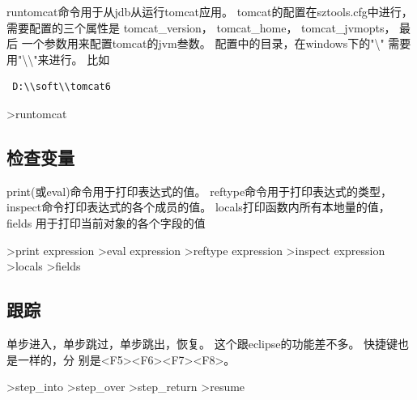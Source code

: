 \documentclass[oneside,openany]{book}
\begin{document}
    runtomcat命令用于从jdb从运行tomcat应用。 tomcat的配置在sztools.cfg中进行， 
    需要配置的三个属性是 tomcat\_version， tomcat\_home， tomcat\_jvmopts， 最后
    一个参数用来配置tomcat的jvm叁数。 配置中的目录，在windows下的"\textbackslash"
    需要用"\textbackslash\textbackslash"来进行。 比如
    \begin{verbatim} D:\\soft\\tomcat6 \end{verbatim}
    \begin{mdframed}[style=SmallFrame]
     \begin{flushleft}
      >runtomcat
     \end{flushleft}
    \end{mdframed}

  \subsection{检查变量}
    print(或eval)命令用于打印表达式的值。 reftype命令用于打印表达式的类型，
  inspect命令打印表达式的各个成员的值。 locals打印函数内所有本地量的值， fields
  用于打印当前对象的各个字段的值
    \begin{mdframed}[style=SmallFrame]
      \begin{flushleft}
      >print expression\newline
      >eval expression\newline
      >reftype expression\newline                      
      >inspect expression\newline                      
      >locals\newline                      
      >fields
      \end{flushleft}
    \end{mdframed}

  \subsection{跟踪}

    单步进入，单步跳过，单步跳出，恢复。 这个跟eclipse的功能差不多。 快捷键也是一样的，分
    别是<F5><F6><F7><F8>。
    \begin{mdframed}[style=SmallFrame]
      \begin{flushleft}
      >step\_into\newline
      >step\_over\newline
      >step\_return\newline
      >resume           
      \end{flushleft}
    \end{mdframed}
\end{document}
